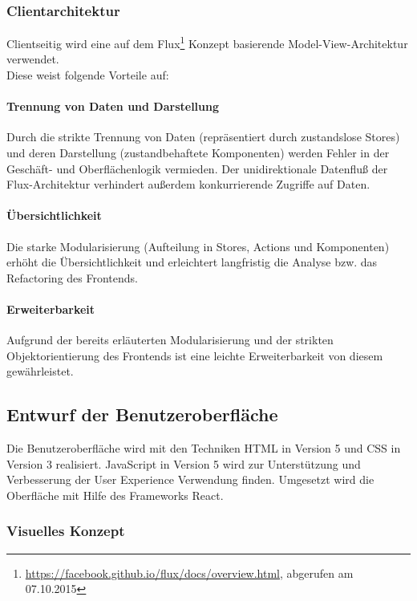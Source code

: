 \documentclass[12pt, xcolor=dvipsnames]{scrartcl}
\begin{document}
\subsubsection{Clientarchitektur}

Clientseitig wird eine auf dem
Flux\footnote{\url{https://facebook.github.io/flux/docs/overview.html}, abgerufen am 07.10.2015} Konzept basierende Model-View-Architektur verwendet. \\

Diese weist folgende Vorteile auf:

\paragraph{Trennung von Daten und Darstellung}
Durch die strikte Trennung von Daten (repräsentiert durch zustandslose Stores) und deren Darstellung (zustandbehaftete Komponenten) werden Fehler in der Geschäft- und Oberflächenlogik vermieden. Der unidirektionale Datenfluß der Flux-Architektur verhindert außerdem konkurrierende Zugriffe auf Daten.

\paragraph{Übersichtlichkeit}
Die starke Modularisierung (Aufteilung in Stores, Actions und Komponenten) erhöht die Übersichtlichkeit und erleichtert langfristig die Analyse bzw. das Refactoring des Frontends.

\paragraph{Erweiterbarkeit}
Aufgrund der bereits erläuterten Modularisierung und der strikten Objektorientierung des Frontends ist eine leichte Erweiterbarkeit von diesem gewährleistet.

\subsection{Entwurf der Benutzeroberfläche}

Die Benutzeroberfläche wird mit den Techniken HTML in Version 5 und CSS in Version 3 realisiert. JavaScript in Version 5 wird zur Unterstützung und Verbesserung der User Experience Verwendung finden. Umgesetzt wird die Oberfläche mit Hilfe des Frameworks React.

\subsubsection{Visuelles Konzept}
\end{document}
